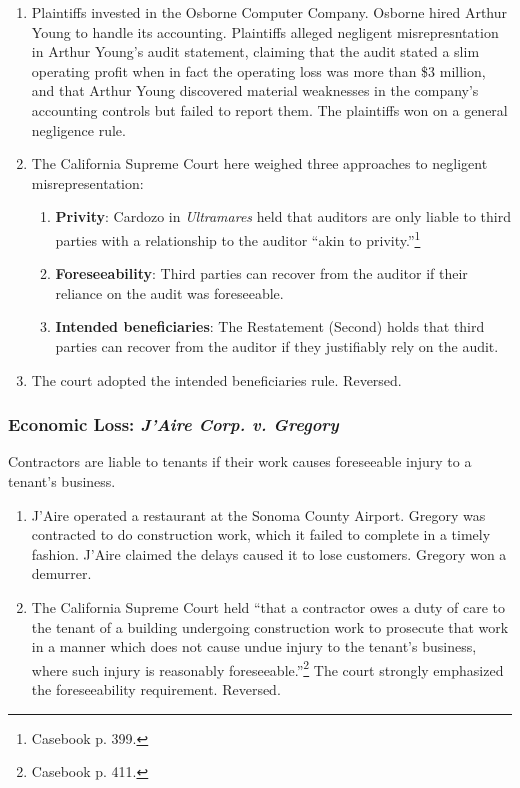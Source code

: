 \begin{enumerate}
    \item Plaintiffs invested in the Osborne Computer Company. Osborne hired 
    Arthur Young to handle its accounting. Plaintiffs alleged negligent 
    misrepresntation in Arthur Young's audit statement, claiming that the 
    audit stated a slim operating profit when in fact the operating loss was 
    more than \$3 million, and that Arthur Young discovered material 
    weaknesses in the company's accounting controls but failed to report them. 
    The plaintiffs won on a general negligence rule.
    \item The California Supreme Court here weighed three approaches to 
    negligent misrepresentation:
    \begin{enumerate}
        \item \textbf{Privity}: Cardozo in \emph{Ultramares} held that 
        auditors are only liable to third parties with a relationship to the 
        auditor ``akin to privity.''\footnote{Casebook p. 399.}
        \item \textbf{Foreseeability}: Third parties can recover from the 
        auditor if their reliance on the audit was foreseeable.
        \item \textbf{Intended beneficiaries}: The Restatement (Second) holds 
        that third parties can recover from the auditor if they justifiably 
        rely on the audit.
    \end{enumerate}
    \item The court adopted the intended beneficiaries rule. Reversed.
\end{enumerate}

\subsubsection{Economic Loss: \emph{J'Aire Corp. v. Gregory}}

Contractors are liable to tenants if their work causes foreseeable injury to a 
tenant's business.

\begin{enumerate}
    \item J'Aire operated a restaurant at the Sonoma County Airport. Gregory 
    was contracted to do construction work, which it failed to complete in a 
    timely fashion. J'Aire claimed the delays caused it to lose customers. 
    Gregory won a demurrer.
    \item The California Supreme Court held ``that a contractor owes a duty of 
    care to the tenant of a building undergoing construction work to prosecute 
    that work in a manner which does not cause undue injury to the tenant's 
    business, where such injury is reasonably foreseeable.''\footnote{Casebook 
    p. 411.} The court strongly emphasized the foreseeability requirement. 
    Reversed.
\end{enumerate}
